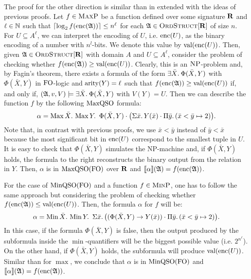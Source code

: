 The proof for the other direction is similar than in \cite{kolaitis1994logical} extended with the ideas of previous proofs. Let $f\in \text{\sc MaxP}$ be a function defined over some signature $\mathbf{R}$ and
$\ell\in\mathbb{N}$ such that $\lceil\log_2 f({\rm enc}(\mathfrak{A})) \rceil \leq n^\ell$ for each $\mathfrak{A}\in\text{\sc OrdStruct}[\mathbf{R}]$ of size $n$.
For $U \subseteq A^{\ell}$, we can interpret the encoding of $U$, i.e. ${\rm enc}(U)$, as the binary encoding of a number with $n^l$-bits. We denote this value by $\text{\rm val}({\rm enc}(U))$.
Then, given $\mathfrak{A}\in\text{\sc OrdStruct}[\mathbf{R}]$ with domain $A$ and $U \subseteq A^{\ell}$, consider the problem of checking whether $f({\rm enc}(\mathfrak{A})) \geq \text{\rm val}({\rm enc}(U))$. 
Clearly, this is an $\text{\sc NP}$-problem and, by Fagin's theorem, there exists a formula of the form $\exists{\bar{X}}.\: \Phi(\bar{X}, Y)$ with $\Phi(\bar{X}, Y)$ in ${\rm FO}$-logic and ${\rm arity}(Y) = \ell$ such that $f({\rm enc}(\mathfrak{A})) \geq \text{\rm val}({\rm enc}(U))$ if, and only if, $(\mathfrak{A},v,V) \models \exists{\bar{X}}.\: \Phi(\bar{X}, Y)$ with $V(Y) = U$. 
Then we can describe the function $f$ by the following ${\rm MaxQSO}$ formula:
$$
\alpha = \maxa{\bar{X}} \maxa{Y} \ \Phi(\bar{X}, Y) \cdot \big( \sa{\bar{x}} Y(\bar{x}) \cdot \pa{\bar{y}}(\bar{x} < \bar{y} \mapsto 2) \big).
$$
Note that, in contrast with previous proofs, we use $\bar{x} < \bar{y}$ instead of $\bar{y} < \bar{x}$ because the most significant bit in ${\rm enc}(U)$ correspond to the smallest tuple in $U$.  
It is easy to check that $\Phi(\bar{X}, Y)$ simulates the NP-machine and, if $\Phi(\bar{X}, Y)$ holds, the formula to the right  reconstructs the binary output from the relation in $Y$.
Then, $\alpha$ is in ${\rm MaxQSO}({\rm FO})$ over $\mathbf{R}$ and ${\llbracket{}{\alpha}\rrbracket}(\mathfrak{A}) = f({\rm enc}(\mathfrak{A}))$. 

For the case of ${\rm MinQSO}({\rm FO})$ and a function $f \in \text{\sc MinP}$, one has to follow the same approach but considering the problem of checking whether $f({\rm enc}(\mathfrak{A})) \leq \text{\rm val}({\rm enc}(U))$. Then, the formula $\alpha$ for $f$ will be:
$$
\alpha = \mina{\bar{X}} \mina{Y} \ \sa{\bar{x}} \big( (\Phi(\bar{X}, Y) \rightarrow Y(\bar{x})) \cdot \pa{\bar{y}}(\bar{x} < \bar{y} \mapsto 2)  \big).
$$
In this case, if the formula $\Phi(\bar{X}, Y)$ is false, then the output produced by the subformula inside the $\min$-quantifiers will be the biggest possible value (i.e. $2^{n^\ell}$).
On the other hand, if $\Phi(\bar{X}, Y)$ holds, the subformula will produce $\text{\rm val}({\rm enc}(U))$. 
Similar than for $\max$, we conclude that $\alpha$ is in ${\rm MinQSO}({\rm FO})$ and ${\llbracket{}{\alpha}\rrbracket}(\mathfrak{A}) = f({\rm enc}(\mathfrak{A}))$. 


